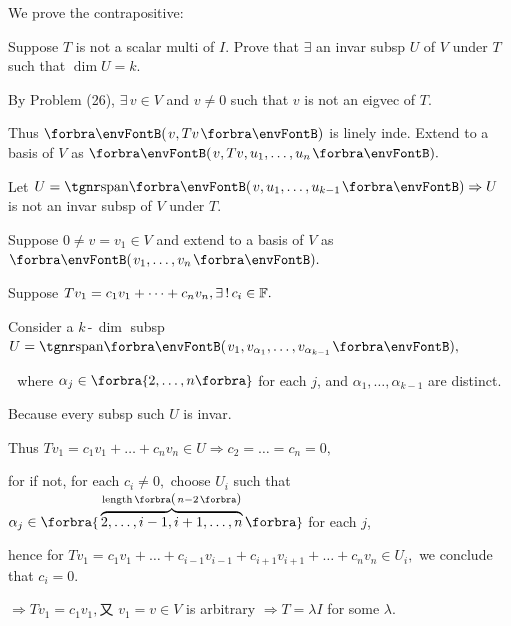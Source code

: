 \documentclass[a4paper, 11pt, UTF8]{article}
\begin{document}
\begin{large}
We prove the contrapositive:\par\quad
{\tgsl Suppose $T$ is not a scalar multi of $I$. Prove that $\exists$ an invar subsp $U$ of $V$ under $T$ such that $\dim U=k$.}\par\quad
By Problem (26), $\exists\,v\in V$ and $v\neq 0$ such that $v$ is not an eigvec of $T.$\par\quad
Thus $\Par{v,Tv}$ is linely inde. Extend to a basis of $V$ as $\Par{v,Tv,u_1,\dots,u_n}.$\par\quad
Let $U=\Span{v,u_1,\dots,u_{k-1}}\Rightarrow U$ is not an invar subsp of $V$ under $T.$\par\quad
\Or Suppose $0\neq v=v_1\in V$ and extend to a basis of $V$ as $\Par{v_1,\dots,v_n}.$\par\quad
Suppose $Tv_1=c_1 v_1+\dots+c_n v_n,\exists\,!\,c_i\in{\mathbb{F}}.$\par\quad
Consider a $k\,$-$\,\dim$ subsp $U=\Span{v_1,v_{\alpha_1},\dots,v_{\alpha_{k-1}}},$\par\qquad\qquad\,\,
where $\alpha_j\in\Bra{2,\dots,n}$ for each $j$, and $\alpha_1,\dots,\alpha_{k-1}$ are distinct.\par\quad
Because every subsp such $U$ is invar.\par\quad
Thus $Tv_1=c_1 v_1+\dots+c_n v_n\in U\Rightarrow c_2=\dots=c_n=0,$\par\quad
for if not, for each $c_i\neq 0,$ choose $U_i$ such that $\alpha_j\in\Bra{\overbrace{2,\dots,i-1,i+1,\dots,n}^{\text{length}\,\envFontSmall\Par{n-2}}}$ for each $j$,\par\quad
hence for $Tv_1=c_1 v_1+\dots+c_{i-1}v_{i-1}+c_{i+1}v_{i+1}+\dots+c_n v_n\in U_i,$ we conclude that $c_i=0.$\par\quad
$\Rightarrow Tv_1=c_1 v_1, $又 $v_1=v\in V$ is arbitrary $\Rightarrow T=\lambda I$ for some $\lambda.$\PfEnd
\SepLine\pagebreak


\end{large}
\end{document}
